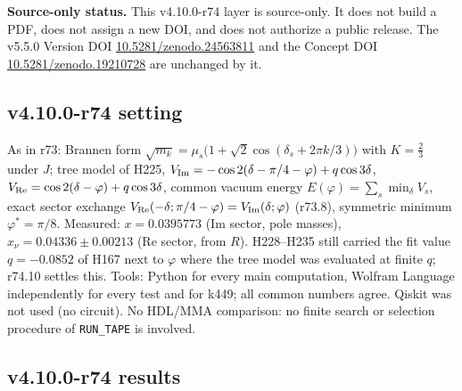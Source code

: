 \noindent\textbf{Source-only status.}
This v4.10.0-r74 layer is source-only.  It does not build a PDF, does not assign a new DOI,
and does not authorize a public release.  The v5.5.0 Version DOI
\href{https://doi.org/10.5281/zenodo.24563811}{10.5281/zenodo.24563811} and the Concept DOI
\href{https://doi.org/10.5281/zenodo.19210728}{10.5281/zenodo.19210728} are unchanged by it.

\subsection*{v4.10.0-r74 setting}
\label{subsec:v4100-r74-setting}

As in r73: Brannen form \(\sqrt{m_k}=\mu_s\bigl(1+\sqrt2\cos(\delta_s+2\pi k/3)\bigr)\) with \(K=\tfrac23\) under \(J\); tree model of H225,
\(V_{\rm Im}=-\cos2(\delta-\pi/4-\varphi)+q\cos3\delta\), \(V_{\rm Re}=\cos2(\delta-\varphi)+q\cos3\delta\), common vacuum energy
\(E(\varphi)=\sum_s\min_\delta V_s\), exact sector exchange \(V_{\rm Re}(-\delta;\pi/4-\varphi)=V_{\rm Im}(\delta;\varphi)\) (r73.8), symmetric
minimum \(\varphi^*=\pi/8\).  Measured: \(x=0.0395773\) (Im sector, pole masses), \(x_\nu=0.04336\pm0.00213\) (Re sector, from \(R\)).
H228--H235 still carried the fit value \(q=-0.0852\) of H167 next to \(\varphi\) where the tree model was evaluated at finite \(q\); r74.10 settles
this.  Tools: Python for every main computation, Wolfram Language independently for every test and for k449; all common numbers agree.
Qiskit was not used (no circuit).  No HDL/MMA comparison: no finite search or selection procedure of \texttt{RUN\_TAPE} is involved.

\subsection*{v4.10.0-r74 results}
\label{subsec:v4100-r74-results}

